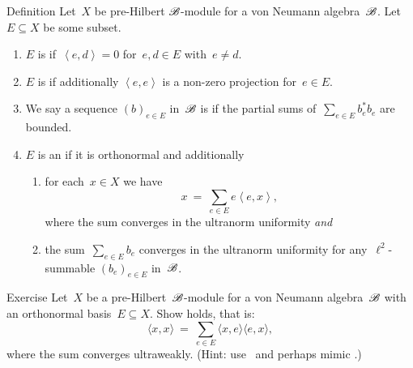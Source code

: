 \documentclass[b]{subfiles}
\begin{document}
\begin{parsec}%
\begin{point}{Definition}
    Let~$X$ be pre-Hilbert $\mathscr{B}$-module
        for a von Neumann algebra~$\mathscr{B}$.
    Let~$E \subseteq X$ be some subset.
    \begin{enumerate}
        \item $E$ is  if~$\left<e,d\right> = 0$
            for~$e,d \in E$ with~$e \neq d$.
        \item $E$ is  if additionally
                    $\left<e,e\right>$ is a non-zero projection
                    for~$e \in E$.
        \item We say a sequence $(b)_{e \in E}$ in~$\mathscr{B}$
                is 
                if the partial sums of~$\sum_{e \in E} b_e^*b_e$
                are bounded.
        \item $E$ is an  if
                it is orthonormal and additionally
            \begin{enumerate}
                \item for each~$x \in X$ we have
                    \begin{equation*}
                        x \ =\  \sum_{e \in E} e\left<e,x\right>,
                    \end{equation*}
                    where the sum converges in the ultranorm uniformity
                    \emph{and}
                \item  the sum~$\sum_{e \in E} b_e$
                        converges in the ultranorm uniformity
                    for any~$\ell^2$-summable $(b_e)_{e \in E}$
                        in~$\mathscr{B}$.
            \end{enumerate}
    \end{enumerate}
\end{point}
\begin{point}{Exercise}
Let~$X$ be a pre-Hilbert~$\mathscr{B}$-module for a von Neumann algebra~$\mathscr{B}$
    with an orthonormal basis~$E \subseteq X$.
Show  holds, that is:
\begin{equation*}
    \langle x, x \rangle \ =\ 
    \sum_{e \in E} \langle x, e\rangle \langle e, x\rangle,
\end{equation*}
where the sum converges ultraweakly.
(Hint: use~
    and perhaps mimic .) 
\end{point}

\end{parsec}
\end{document}
